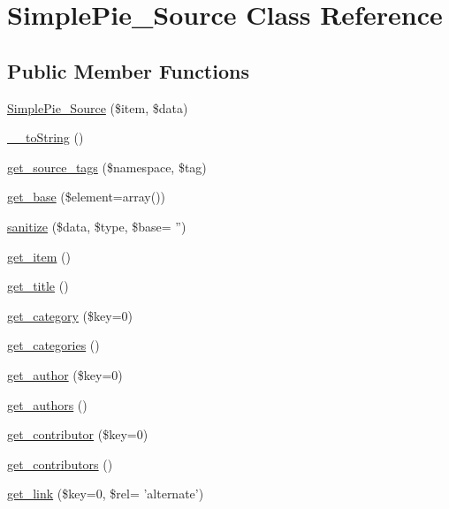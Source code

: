 \hypertarget{class_simple_pie___source}{\section{Simple\-Pie\-\_\-\-Source Class Reference}
\label{class_simple_pie___source}
}
\subsection*{Public Member Functions}
\begin{DoxyCompactItemize}
\item 
\hyperlink{class_simple_pie___source_ae2e423f779b70b8f192baa8148eddd1d}{Simple\-Pie\-\_\-\-Source} (\$item, \$data)
\item 
\hyperlink{class_simple_pie___source_ae81779c794599427ae476ccec2a71e2d}{\-\_\-\-\_\-to\-String} ()
\item 
\hyperlink{class_simple_pie___source_a1b1219e830c430c42734459cee616bed}{get\-\_\-source\-\_\-tags} (\$namespace, \$tag)
\item 
\hyperlink{class_simple_pie___source_aa29847ec8fbcccf5bacb5f1223f93e2c}{get\-\_\-base} (\$element=array())
\item 
\hyperlink{class_simple_pie___source_a3e5417323a02ae8451f7f39d25979b99}{sanitize} (\$data, \$type, \$base= '')
\item 
\hyperlink{class_simple_pie___source_a0ace613ccbfd5973c2a04f936e519598}{get\-\_\-item} ()
\item 
\hyperlink{class_simple_pie___source_a66a5d8b1d1944eb7e6cad36175571d07}{get\-\_\-title} ()
\item 
\hyperlink{class_simple_pie___source_afb9781e4063687f74e0086a6037a65b3}{get\-\_\-category} (\$key=0)
\item 
\hyperlink{class_simple_pie___source_ab91845cdb95cdae5f796246682a5d102}{get\-\_\-categories} ()
\item 
\hyperlink{class_simple_pie___source_a8a7b95d615cd62a1b8c4a44a9e8d35f8}{get\-\_\-author} (\$key=0)
\item 
\hyperlink{class_simple_pie___source_a4298ecd5877384fad6ce948649438aeb}{get\-\_\-authors} ()
\item 
\hyperlink{class_simple_pie___source_a6d178c2b5e1896fde65e97f23563e30d}{get\-\_\-contributor} (\$key=0)
\item 
\hyperlink{class_simple_pie___source_a1a1cf8c0ed2662f7e314d8a731567a49}{get\-\_\-contributors} ()
\item 
\hyperlink{class_simple_pie___source_a455244216fa3e8f07eb35df08914bc17}{get\-\_\-link} (\$key=0, \$rel= 'alternate')

\end{DoxyCompactItemize}
